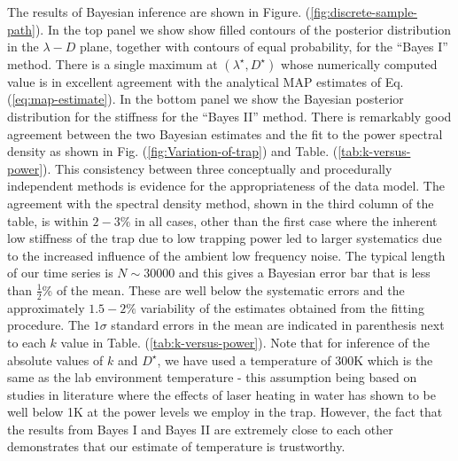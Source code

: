 \documentclass[english,aps, onecolumn, prl,superscriptaddress, notitlepage]{revtex4-1}
\begin{document}
The results of Bayesian inference are shown in Figure. (\ref{fig:discrete-sample-path}).
In the top panel we show show filled contours of the posterior distribution
in the $\lambda-D$ plane, together with contours of equal probability,
for the ``Bayes I'' method. There is a single maximum at $(\lambda^{\star},D^{\star})$
whose numerically computed value is in excellent agreement with the
analytical MAP estimates of Eq.(\ref{eq:map-estimate}). In the bottom
panel we show the Bayesian posterior distribution for the stiffness
for the ``Bayes II'' method. There is remarkably good agreement
between the two Bayesian estimates and the fit to the power spectral
density as shown in Fig. (\ref{fig:Variation-of-trap}) and Table.
(\ref{tab:k-versus-power}). This consistency between three conceptually
and procedurally independent methods is evidence for the appropriateness
of the data model. The agreement with the spectral density method,
shown in the third column of the table, is within $2-3\%$ in all
cases, other than the first case where the inherent low stiffness
of the trap due to low trapping power led to larger systematics due
to the increased influence of the ambient low frequency noise. The
typical length of our time series is $N\sim30000$ and this gives
a Bayesian error bar that is less than $\frac{1}{2}$\% of the mean.
These are well below the systematic errors and the approximately $1.5-2\%$
variability of the estimates obtained from the fitting procedure.
The $1\sigma$ standard errors in the mean are indicated in parenthesis
next to each $k$ value in Table. (\ref{tab:k-versus-power}). Note
that for inference of the absolute values of $k$ and $D^{\star}$,
we have used a temperature of 300K which is the same as the lab
environment temperature - this assumption being based on studies in
literature \cite{schmidt03heating}where the effects of laser heating
in water has shown to be well below 1K at the power levels we employ
in the trap. However, the fact that the results from Bayes I and Bayes
II are extremely close to each other demonstrates that our estimate
of temperature is trustworthy.
\end{document}

